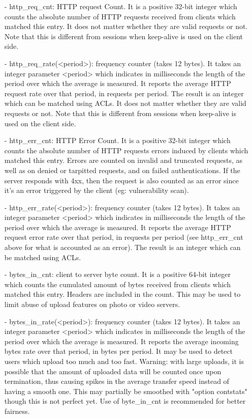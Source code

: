 \begin{itemize}
  \item[-] http\_req\_cnt: HTTP request Count. It is a positive 32-bit integer which
      counts the absolute number of HTTP requests received from clients which
      matched this entry. It does not matter whether they are valid requests or
      not. Note that this is different from sessions when keep-alive is used on
      the client side.

  \item[-] http\_req\_rate(<period>): frequency counter (takes 12 bytes). It takes an
      integer parameter <period> which indicates in milliseconds the length
      of the period over which the average is measured. It reports the average
      HTTP request rate over that period, in requests per period. The result is
      an integer which can be matched using ACLs. It does not matter whether
      they are valid requests or not. Note that this is different from sessions
      when keep-alive is used on the client side.

  \item[-] http\_err\_cnt: HTTP Error Count. It is a positive 32-bit integer which
      counts the absolute number of HTTP requests errors induced by clients
      which matched this entry. Errors are counted on invalid and truncated
      requests, as well as on denied or tarpitted requests, and on failed
      authentications. If the server responds with 4xx, then the request is
      also counted as an error since it's an error triggered by the client
      (eg: vulnerability scan).

  \item[-] http\_err\_rate(<period>): frequency counter (takes 12 bytes). It takes an
      integer parameter <period> which indicates in milliseconds the length
      of the period over which the average is measured. It reports the average
      HTTP request error rate over that period, in requests per period (see
      http\_err\_cnt above for what is accounted as an error). The result is an
      integer which can be matched using ACLs.

  \item[-] bytes\_in\_cnt: client to server byte count. It is a positive 64-bit
      integer which counts the cumulated amount of bytes received from clients
      which matched this entry. Headers are included in the count. This may be
      used to limit abuse of upload features on photo or video servers.

  \item[-] bytes\_in\_rate(<period>): frequency counter (takes 12 bytes). It takes an
      integer parameter <period> which indicates in milliseconds the length
      of the period over which the average is measured. It reports the average
      incoming bytes rate over that period, in bytes per period. It may be used
      to detect users which upload too much and too fast. Warning: with large
      uploads, it is possible that the amount of uploaded data will be counted
      once upon termination, thus causing spikes in the average transfer speed
      instead of having a smooth one. This may partially be smoothed with
      "option contstats" though this is not perfect yet. Use of byte\_in\_cnt is
      recommended for better fairness.


\end{itemize}
